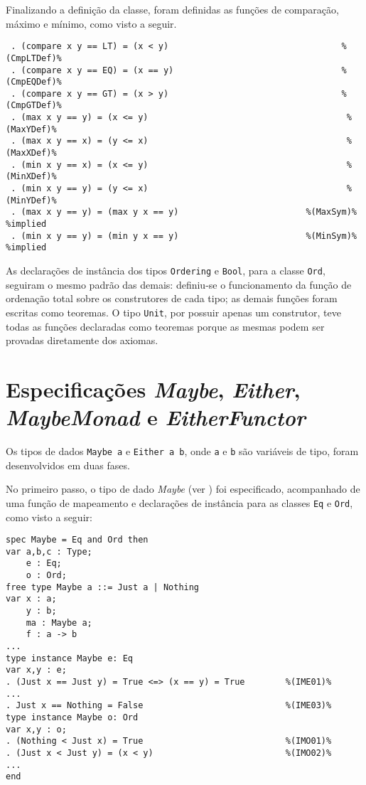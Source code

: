 Finalizando a definição da classe, foram definidas as funções de comparação, máximo e mínimo, como visto a seguir.

\begin{Verbatim}
 . (compare x y == LT) = (x < y)                                  %(CmpLTDef)%
 . (compare x y == EQ) = (x == y)                                 %(CmpEQDef)%
 . (compare x y == GT) = (x > y)                                  %(CmpGTDef)%
 . (max x y == y) = (x <= y)                                       %(MaxYDef)%
 . (max x y == x) = (y <= x)                                       %(MaxXDef)%
 . (min x y == x) = (x <= y)                                       %(MinXDef)%
 . (min x y == y) = (y <= x)                                       %(MinYDef)%
 . (max x y == y) = (max y x == y)                         %(MaxSym)% %implied
 . (min x y == y) = (min y x == y)                         %(MinSym)% %implied
\end{Verbatim}

As declarações de instância dos tipos \Verb.Ordering. e \Verb.Bool., para a classe \Verb.Ord., seguiram o mesmo padrão das demais: definiu-se o funcionamento da função de ordenação total sobre os construtores de cada tipo; as demais funções foram escritas como teoremas.
O tipo \Verb.Unit., por possuir apenas um construtor, teve todas as funções declaradas como teoremas porque as mesmas podem ser provadas diretamente dos axiomas.

\section{Especificações \textit{Maybe}, \textit{Either}, \textit{Maybe\-Monad} e \textit{Ei\-ther\-Func\-tor}}
Os tipos de dados \Verb.Maybe a. e \Verb.Either a b., onde \Verb.a. e \Verb.b. são variáveis de tipo, foram desenvolvidos em duas fases.

No primeiro passo, o tipo de dado \textit{Maybe} (ver ) foi especificado, acompanhado de uma função de mapeamento e declarações de instância para as classes \Verb.Eq. e \Verb.Ord., como visto a seguir:

\begin{Verbatim}
spec Maybe = Eq and Ord then
var a,b,c : Type;
    e : Eq;
    o : Ord;
free type Maybe a ::= Just a | Nothing
var x : a;
    y : b;
    ma : Maybe a;
    f : a -> b
...
type instance Maybe e: Eq
var x,y : e; 
. (Just x == Just y) = True <=> (x == y) = True        %(IME01)%
...
. Just x == Nothing = False                            %(IME03)%
type instance Maybe o: Ord
var x,y : o;
. (Nothing < Just x) = True                            %(IMO01)%
. (Just x < Just y) = (x < y)                          %(IMO02)%
...
end
\end{Verbatim}



